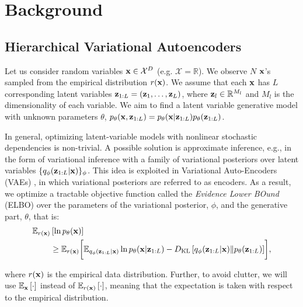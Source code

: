 \section{Background}

\subsection{Hierarchical Variational Autoencoders} \label{sec:5_dvp_vae}

Let us consider random variables ${\mathbf{x}} \in \mathcal{X}^{D}$ (e.g. $\mathcal{X} = \mathbb{R}$). We observe $N$ ${\mathbf{x}}$'s sampled from the empirical distribution $r({\mathbf{x}})$. We assume that each ${\mathbf{x}}$ has $L$ corresponding latent variables ${\mathbf{z}}_{1:L} = ({\mathbf{z}}_1, \dots, {\mathbf{z}}_L)$, where ${\mathbf{z}}_l \in \mathbb{R}^{M_{l}}$ and $M_l$ is the dimensionality of each variable. We aim to find a latent variable generative model with unknown parameters $\theta$, $p_{\theta}({\mathbf{x}}, {\mathbf{z}}_{1:L}) = {p_{\theta}({\mathbf{x}}|{\mathbf{z}}_{1:L})} p_{\theta}({\mathbf{z}}_{1:L})$. 

In general, optimizing latent-variable models with nonlinear stochastic dependencies is non-trivial. A possible solution is approximate inference, e.g., in the form of variational inference \citep{jordan1999introduction} with a family of variational posteriors over latent variables $\{{q_{\phi}({\mathbf{z}}_{1:L}|{\mathbf{x}})}\}_{\phi}$. This idea is exploited in Variational Auto-Encoders (VAEs) \citep{kingma2014autoencoding, rezende2014stochastic}, in which variational posteriors are referred to as encoders. As a result, we optimize a tractable objective function called the \textit{Evidence Lower BOund} (ELBO) over the parameters of the variational posterior, $\phi$, and the generative part, $\theta$, that is:
\begin{equation}\label{eq:vae_elbo}
\begin{aligned}
\E_{r(\rvx)} &\left[\ln p_{\theta}(\rvx)\right]  \\
&\geq \E_{r(\rvx)} \biggl[ \E_{\Enc{\rvz_{1:L}}{\rvx}}\ln \Dec{\rvx}{\rvz_{1:L}} - \KL{\Enc{\rvz_{1:L}}{\rvx}}{p_{\theta}(\rvz_{1:L})} \biggr] ,
\end{aligned}
\end{equation}

where $r({\mathbf{x}})$ is the empirical data distribution. Further, to avoid clutter, we will use $\mathbb{E}_{{\mathbf{x}}}\left[\cdot\right]$ instead of $\mathbb{E}_{r({\mathbf{x}})}\left[\cdot\right]$, meaning that the expectation is taken with respect to the empirical distribution. 

